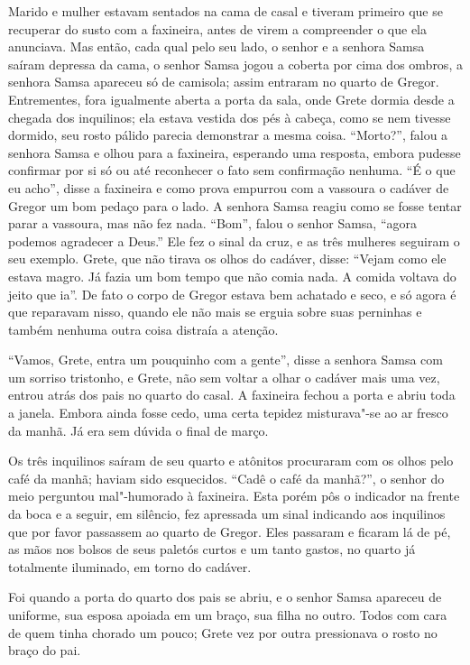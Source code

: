 Marido e mulher estavam sentados na cama de casal e tiveram primeiro que
se recuperar do susto com a faxineira, antes de virem a compreender o que
ela anunciava. Mas então, cada qual pelo seu lado, o senhor e a senhora
Samsa saíram depressa da cama, o senhor Samsa jogou a coberta por cima dos
ombros, a senhora Samsa apareceu só de camisola; assim entraram no quarto
de Gregor. Entrementes, fora igualmente aberta a porta da sala, onde Grete
dormia desde a chegada dos inquilinos; ela estava vestida dos pés à
cabeça, como se nem tivesse dormido, seu rosto pálido parecia demonstrar a
mesma coisa. “Morto?”, falou a senhora Samsa e olhou para a faxineira,
esperando uma resposta, embora pudesse confirmar por si só ou até
reconhecer o fato sem confirmação nenhuma. “É o que eu acho”, disse a
faxineira e como prova empurrou com a vassoura o cadáver de Gregor um bom
pedaço para o lado. A senhora Samsa reagiu como se fosse tentar parar a
vassoura, mas não fez nada. “Bom”, falou o senhor Samsa, “agora podemos
agradecer a Deus.” Ele fez o sinal da cruz, e as três mulheres seguiram o
seu exemplo. Grete, que não tirava os olhos do cadáver, disse: “Vejam como
ele estava magro. Já fazia um bom tempo que não comia nada. A comida
voltava do jeito que ia”. De fato o corpo de Gregor estava bem achatado e
seco, e só agora é que reparavam nisso, quando ele não mais se erguia
sobre suas perninhas e também nenhuma outra coisa distraía a atenção.

“Vamos, Grete, entra um pouquinho com a gente”, disse a senhora Samsa com
um sorriso tristonho, e Grete, não sem voltar a olhar o cadáver mais uma
vez, entrou atrás dos pais no quarto do casal. A faxineira fechou a porta
e abriu toda a janela. Embora ainda fosse cedo, uma certa tepidez
misturava"-se ao ar fresco da manhã. Já era sem dúvida o final de março.

Os três inquilinos saíram de seu quarto e atônitos procuraram com os olhos
pelo café da manhã; haviam sido esquecidos. “Cadê o café da manhã?”, o
senhor do meio perguntou mal"-humorado à faxineira. Esta porém pôs o
indicador na frente da boca e a seguir, em silêncio, fez apressada um
sinal indicando aos inquilinos que por favor passassem ao quarto de
Gregor. Eles passaram e ficaram lá de pé, as mãos nos bolsos de seus
paletós curtos e um tanto gastos, no quarto já totalmente iluminado, em
torno do cadáver.

Foi quando a porta do quarto dos pais se abriu, e o senhor Samsa apareceu
de uniforme, sua esposa apoiada em um braço, sua filha no outro. Todos com
cara de quem tinha chorado um pouco; Grete vez por outra pressionava o
rosto no braço do pai.

